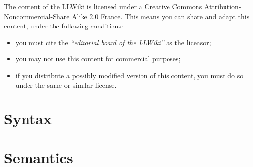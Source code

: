 \documentclass[a4paper,11pt,oneside]{book}
\begin{document}
The content of the LLWiki is licensed under a \href{http://creativecommons.org/licenses/by-nc-sa/2.0/fr/deed.en License}{Creative Commons Attribution-Noncommercial-Share Alike 2.0 France}.
This means you can share and adapt this content, under the following conditions:
\begin{itemize}
\item you must cite the \emph{``editorial board of the LLWiki''} as the licensor;
\item you may not use this content for commercial purposes;
\item if you distribute a possibly modified version of this content, you must do so under the same or similar license.
\end{itemize}



\tableofcontents

\part{Syntax}


































\part{Semantics}





















\appendix





\end{document}
